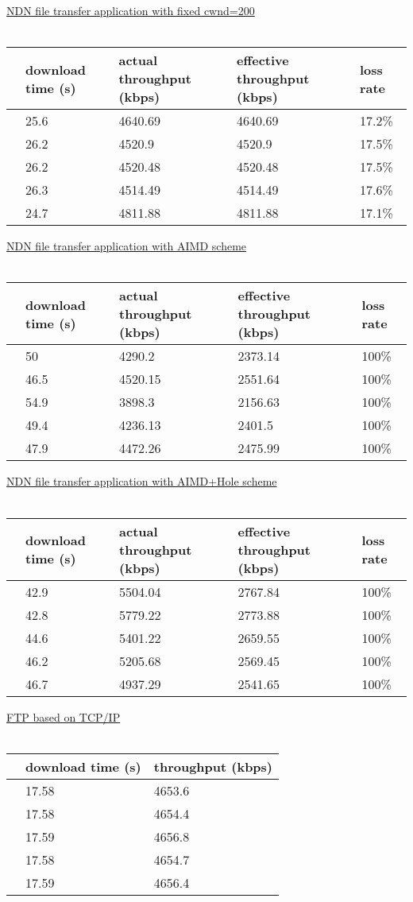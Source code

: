 \documentclass[10pt]{article}
\begin{document}
\vspace{1em}
\underline{NDN file transfer application with fixed cwnd=200}\\\\
\begin{tabular}{ | l | l | l | l | l |}
  \hline
  & download time (s) & actual throughput (kbps) & effective
  throughput (kbps) & loss rate \\\hline
  & 25.6 & 4640.69 & 4640.69 & 17.2\% \\\hline
  & 26.2 & 4520.9 & 4520.9 & 17.5\% \\\hline
  & 26.2 & 4520.48 & 4520.48 & 17.5\% \\\hline
  & 26.3 & 4514.49 & 4514.49 & 17.6\% \\\hline
  & 24.7 & 4811.88 & 4811.88 & 17.1\% \\\hline
\end{tabular}

\vspace{1em}
\underline{NDN file transfer application with AIMD scheme}\\\\
\begin{tabular}{ | l | l | l | l | l |}
  \hline
  & download time (s) & actual throughput (kbps) & effective
  throughput (kbps) & loss rate \\\hline
  & 50 & 4290.2 & 2373.14 & 100\% \\\hline
  & 46.5 & 4520.15 & 2551.64 & 100\% \\\hline
  & 54.9 & 3898.3 & 2156.63 & 100\% \\\hline
  & 49.4 & 4236.13 & 2401.5 & 100\% \\\hline
  & 47.9 & 4472.26 & 2475.99 & 100\% \\\hline
\end{tabular}

\vspace{1em}
\underline{NDN file transfer application with AIMD+Hole scheme}\\\\
\begin{tabular}{ | l | l | l | l | l |}
  \hline
  & download time (s) & actual throughput (kbps) & effective
  throughput (kbps) & loss rate \\\hline
  & 42.9 & 5504.04 & 2767.84 & 100\% \\\hline
  & 42.8 & 5779.22 & 2773.88 & 100\% \\\hline
  & 44.6 & 5401.22 & 2659.55 & 100\% \\\hline
  & 46.2 & 5205.68 & 2569.45 & 100\% \\\hline
  & 46.7 & 4937.29 & 2541.65 & 100\% \\\hline
\end{tabular}

\vspace{1em}
\underline{FTP based on TCP/IP}\\\\
\begin{tabular}{ | l | l | l |}
  \hline
  & download time (s) & throughput (kbps) \\\hline
  & 17.58 & 4653.6 \\\hline
  & 17.58 & 4654.4 \\\hline
  & 17.59 & 4656.8 \\\hline
  & 17.58 & 4654.7 \\\hline
  & 17.59 & 4656.4 \\\hline
\end{tabular}
\end{document}
